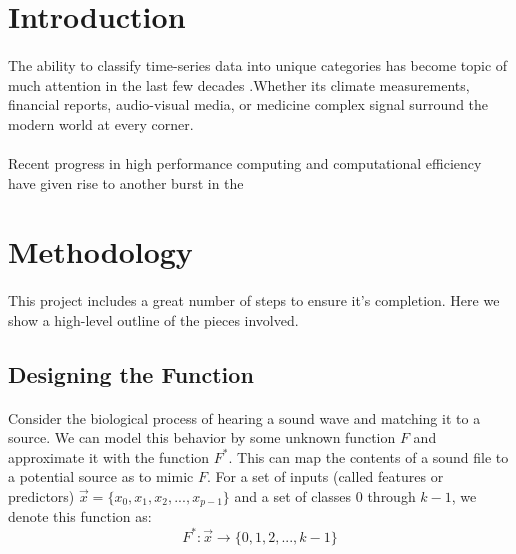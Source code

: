 \documentclass[12pt,letterpaper]{article}
\begin{document}
\begin{abstract}

\end{abstract}

\newpage
\section{Introduction}
\label{sec-Introduction}

\paragraph*{}The ability to classify time-series data into unique categories has become topic of much attention in the last few decades \cite{Khan}.Whether its climate measurements, financial reports, audio-visual media, or medicine complex signal surround the modern world at every corner.  


\paragraph*{}Recent progress in high performance computing and computational efficiency have given rise to another burst in the 


\newpage
\section{Methodology}
\label{sec-Methodology}

\paragraph*{}This project includes a great number of steps to ensure it's completion. Here we show a high-level outline of the pieces involved.


\subsection{Designing the Function}

\paragraph*{}Consider the biological process of hearing a sound wave and matching it to a source. We can model this behavior by some unknown function $F$ and approximate it with the function $F^*$. This can map the contents of a sound file to a potential source as to mimic $F$. For a set of inputs (called features or predictors) $\vec{x} = \big\{ x_0 , x_1 , x_2 , ... , x_{p-1} \big\}$ and a set of classes $0$ through $k-1$, we denote this function as:
\begin{equation}
\label{eqn-MappingFunction}
F^*: \vec{x} \rightarrow \big\{ 0 , 1 , 2 , ... , k-1 \big\}
\end{equation}
\end{document}

